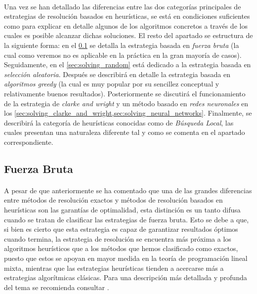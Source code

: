 \documentclass{subfiles}
\begin{document}
      \paragraph{}
      Una vez se han detallado las diferencias entre las dos categorías principales de estrategias de resolución basados en heurísticas, se está en condiciones suficientes como para explicar en detalle algunos de los algoritmos concretos a través de los cuales es posible alcanzar dichas soluciones. El resto del apartado se estructura de la siguiente forma: en el \cref{sec:solving_brute_force} se detalla la estrategia basada en \emph{fuerza bruta} (la cual como veremos no es aplicable en la práctica en la gran mayoría de casos). Seguidamente, en el \cref{sec:solving_random} está dedicado a la estrategia basada en \emph{selección aleatoria}. Después se describirá en detalle la estrategia basada en \emph{algoritmos greedy} (la cual es muy popular por su sencillez conceptual y relativamente buenos resultados). Posteriormente se discutirá el funcionamiento de la estrategia de \emph{clarke and wright} y un método basado en \emph{redes neuronales} en los \cref{sec:solving_clarke_and_wright,sec:solving_neural_networks}. Finalmente, se describirá la categoría de heurísticas conocidas como de \emph{Búsqueda Local}, las cuales presentan una naturaleza diferente tal y como se comenta en el apartado correspondiente.

      \subsection{Fuerza Bruta}
      \label{sec:solving_brute_force}

        \paragraph{}
        A pesar de que anteriormente se ha comentado que una de las grandes diferencias entre métodos de resolución exactos y métodos de resolución basados en heurísticas son las garantías de optimalidad, esta distinción es un tanto difusa cuando se tratan de clasificar las estrategias de fuerza bruta. Esto se debe a que, si bien es cierto que esta estrategia es capaz de garantizar resultados óptimos cuando termina, la estrategia de resolución se encuentra más próxima a los algoritmos heurísticos que a los métodos que hemos clasificado como exactos, puesto que estos se apoyan en mayor medida en la teoría de programación lineal mixta, mientras que las estrategias heurísticas tienden a acercarse más a estrategias algorítmicas clásicas. Para una descripción más detallada y profunda del tema se recomienda consultar \cite{cormen2009introduction}.
\end{document}
